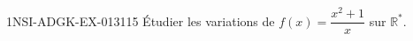 \begin{exercice}{1NSI-ADGK-EX-013}{1}{15}
Étudier les variations de $f(x) = \dfrac{x^2+1}{x}$ sur $\mathbb{R}^*$.

\end{exercice}
